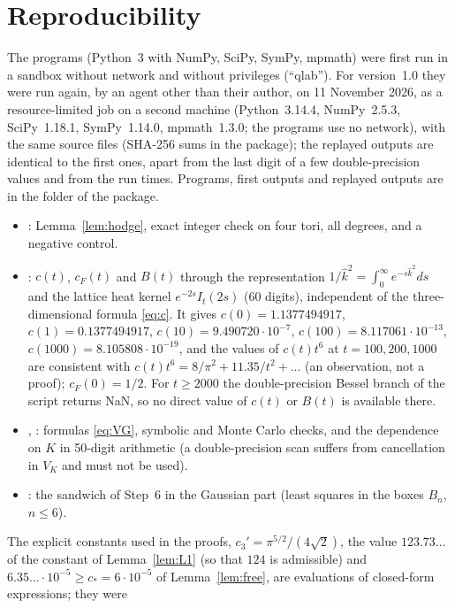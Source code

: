 \documentclass[11pt,a4paper]{article}
\theoremstyle{plain}
\theoremstyle{definition}
\theoremstyle{remark}
\numberwithin{equation}{section}
\begin{document}
\section{Reproducibility}\label{sec:repro}
The programs (Python~3 with NumPy, SciPy, SymPy, mpmath) were first run in a sandbox without network and without privileges (``qlab''). For
version~1.0 they were run again, by an agent other than their author, on 11 November 2026, as a resource-limited job on a second machine (Python~3.14.4, NumPy~2.5.3, SciPy~1.18.1, SymPy~1.14.0, mpmath~1.3.0; the programs use no network), with the
same source files (SHA-256 sums in the package); the replayed outputs are identical to the first ones, apart from the last digit of a few double-precision values and from the run times. Programs, first outputs
and replayed outputs are in the folder  of the package.
\begin{itemize}
\item {}: Lemma~\ref{lem:hodge}, exact integer check on four tori, all degrees, and a negative control.
\item {}: $c(t)$, $c_F(t)$ and $B(t)$ through the representation $1/\hat k^2=\int_0^\infty e^{-s\hat k^2}ds$ and the
lattice heat kernel $e^{-2s}I_t(2s)$ (60 digits), independent of the three-dimensional formula \eqref{eq:c}. It gives
$c(0)=1.1377494917$, $c(1)=0.1377494917$, $c(10)=9.490720\cdot10^{-7}$, $c(100)=8.117061\cdot10^{-13}$, $c(1000)=8.105808\cdot10^{-19}$,
and the values of $c(t)t^6$ at $t=100,200,1000$ are consistent with $c(t)t^6=8/\pi^2+11.35/t^2+\dots$ (an observation, not a proof);
$c_F(0)=1/2$. For $t\ge2000$ the double-precision Bessel branch of the script returns NaN, so no direct value of $c(t)$ or $B(t)$ is
available there.
\item {}, : formulas \eqref{eq:VG}, symbolic and Monte Carlo checks, and the dependence on $K$
in 50-digit arithmetic (a double-precision scan suffers from cancellation in $V_K$ and must not be used).
\item {}: the sandwich of Step~6 in the Gaussian part (least squares in the boxes $B_n$, $n\le6$).
\end{itemize}
The explicit constants used in the proofs, $c_3'=\pi^{5/2}/(4\sqrt2)$, the value $123.73\ldots$ of the constant of Lemma~\ref{lem:L1} (so that
$124$ is admissible) and $6.35\ldots\cdot10^{-5}\ge c_*=6\cdot10^{-5}$ of Lemma~\ref{lem:free}, are evaluations of closed-form expressions; they were
\end{document}
